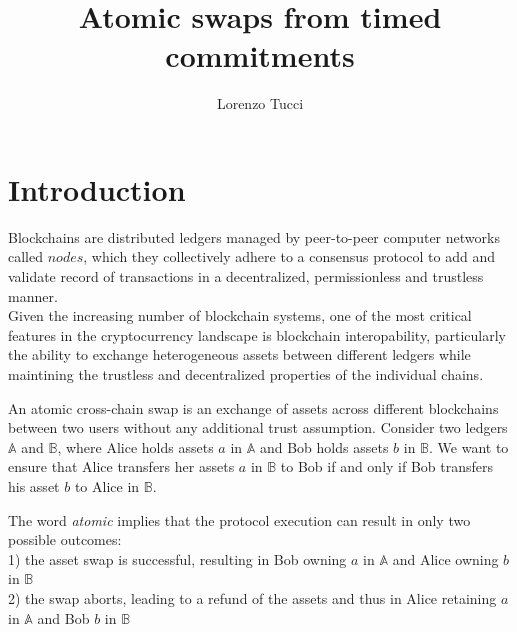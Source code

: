 \documentclass{article}      	%
\begin{document}
         
\author{Lorenzo Tucci}
\title{Atomic swaps from timed commitments}

\maketitle

\tableofcontents
\newpage
\section{Introduction}

Blockchains are distributed ledgers managed by peer-to-peer computer networks called $nodes$, which they collectively adhere to a consensus protocol to add and validate record of transactions in a decentralized, permissionless and trustless manner. \\
Given the increasing number of blockchain systems, one of the most critical features in the cryptocurrency landscape is blockchain interopability, particularly the ability to exchange heterogeneous assets between different ledgers while maintining the trustless and decentralized properties of the individual chains. 

An atomic cross-chain swap is an exchange of assets across different blockchains between two users without any additional trust assumption. 
Consider two ledgers $\mathbb{A}$ and $\mathbb{B}$, where Alice holds assets $a$ in $\mathbb{A}$ and Bob holds assets $b$ in $\mathbb{B}$. We want to ensure that Alice transfers her assets $a$ in $\mathbb{B}$ to Bob if and only if Bob transfers his asset $b$ to Alice in $\mathbb{B}$.

The word \textit{atomic} implies that the protocol execution can result in only two possible outcomes: \\
1) the asset swap is successful, resulting in Bob owning $a$ in $\mathbb{A}$ and Alice owning $b$ in $\mathbb{B}$ \\
2) the swap aborts, leading to a refund of the assets and thus in Alice retaining $a$ in $\mathbb{A}$ and Bob $b$ in $\mathbb{B}$ 
\end{document}
